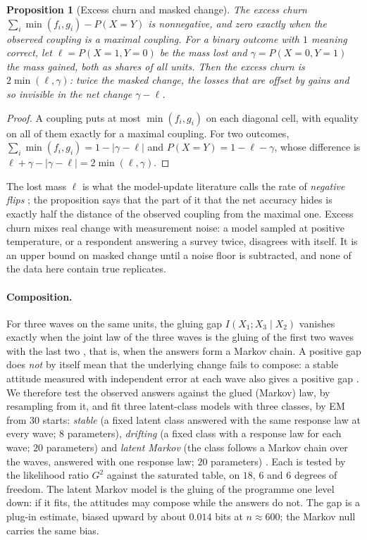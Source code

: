 \documentclass[11pt]{article}
\newtheorem{proposition}[theorem]{Proposition}
\theoremstyle{definition}
\theoremstyle{remark}
\begin{document}
\begin{proposition}[Excess churn and masked change]\label{prop:churn}
The \emph{excess churn} $\sum_i\min(f_i,g_i)-P(X=Y)$ is nonnegative, and zero exactly when the observed coupling is a maximal coupling. For a
binary outcome with $1$ meaning correct, let $\ell=P(X=1,Y=0)$ be the mass lost and $\gamma=P(X=0,Y=1)$ the mass gained, both as shares of
all units. Then the excess churn is $2\min(\ell,\gamma)$: twice the \emph{masked} change, the losses that are offset by gains and so
invisible in the net change $\gamma-\ell$.
\end{proposition}
\begin{proof}
A coupling puts at most $\min(f_i,g_i)$ on each diagonal cell, with equality on all of them exactly for a maximal coupling. For two outcomes,
$\sum_i\min(f_i,g_i)=1-\lvert\gamma-\ell\rvert$ and $P(X=Y)=1-\ell-\gamma$, whose difference is $\ell+\gamma-\lvert\gamma-\ell\rvert=2\min(\ell,\gamma)$.
\end{proof}
\noindent The lost mass $\ell$ is what the model-update literature calls the rate of \emph{negative flips} \cite{Yan2021}; the proposition
says that the part of it that the net accuracy hides is exactly half the distance of the observed coupling from the maximal one.
Excess churn mixes real change with measurement noise: a model sampled at positive temperature, or a respondent answering a survey twice,
disagrees with itself. It is an upper bound on masked change until a noise floor is subtracted, and none of the data here contain true
replicates.

\paragraph{Composition.} For three waves on the same units, the gluing gap $I(X_1;X_3\mid X_2)$ vanishes exactly when the joint law of the
three waves is the gluing of the first two waves with the last two \cite[Prop.~4.8]{Bands}, that is, when the answers form a Markov chain.
A positive gap does \emph{not} by itself mean that the underlying change fails to compose: a stable attitude measured with independent
error at each wave also gives a positive gap \cite{Converse1964,Achen1975,WileyWiley1970}. We therefore test the observed answers
against the glued (Markov) law, by resampling from it, and fit three latent-class models with three classes, by EM from $30$ starts:
\emph{stable} (a fixed latent class answered with the same response law at every wave; $8$ parameters), \emph{drifting} (a fixed class with
a response law for each wave; $20$ parameters) and \emph{latent Markov} (the class follows a Markov chain over the waves, answered with one
response law; $20$ parameters) \cite{Wiggins1973}. Each is tested by the likelihood ratio $G^2$ against the saturated table, on $18$, $6$
and $6$ degrees of freedom. The latent Markov model is the gluing of the programme one level down: if it fits, the attitudes may compose
while the answers do not. The gap is a plug-in estimate, biased upward by about $0.014$ bits at $n\approx600$; the Markov null carries the
same bias.
\end{document}

